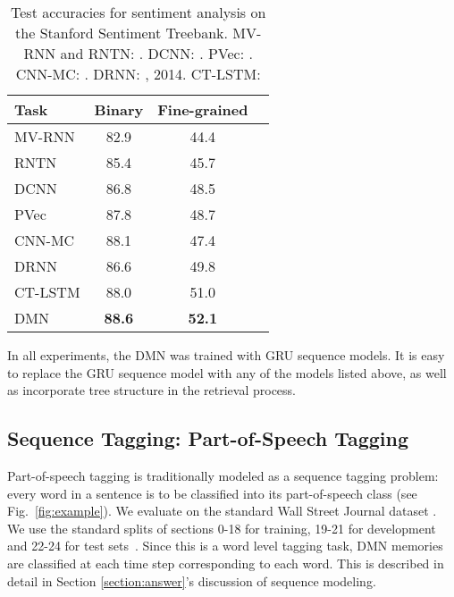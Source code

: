 \documentclass{article}
\begin{document}
\begin{table}[t!]
\begin{center}
\begin{tabular}{lccc}
\toprule
Task & Binary & Fine-grained \\
\midrule
MV-RNN	& 82.9 & 44.4 \\
RNTN 		& 85.4	& 45.7 \\
DCNN		& 86.8 & 48.5 \\
PVec	    & 87.8 & 48.7 \\
CNN-MC	& 88.1 & 47.4 \\
DRNN		& 86.6 & 49.8 \\
CT-LSTM	& 88.0 & 51.0 \\
\midrule
DMN			& \textbf{88.6} & \textbf{52.1} \\
\bottomrule   
\end{tabular}
\end{center}
\vspace{-0.3cm}
\caption{Test accuracies for sentiment analysis on the Stanford Sentiment Treebank. MV-RNN and RNTN: \citet{Socher2013EMNLP}. DCNN:  \citet{Kalchbrenner2014}. PVec: \citet{Le2014}. CNN-MC: \citet{Kim2014}. DRNN: \citet{Irsoy2015}, 2014. CT-LSTM: \citet{Tai2015}
}
\label{ResultsSentiment}
\vspace{-0.3cm}
\end{table}

In all experiments, the DMN was trained with GRU sequence models. It is easy to replace the GRU sequence model with any of the models listed above, as well as incorporate tree structure in the retrieval process. 


\subsection{Sequence Tagging: Part-of-Speech Tagging}
Part-of-speech tagging is traditionally modeled as a sequence tagging problem: every word in a sentence is to be classified into its part-of-speech class (see Fig.~\ref{fig:example}). We evaluate on the standard Wall Street Journal dataset \cite{Marcus1993}. We use the standard splits of sections 0-18 for training, 19-21 for development and 22-24 for test sets~\cite{Sogaard2011}.
Since this is a word level tagging task, DMN memories are classified at each time step corresponding to each word. This is described in detail in Section \ref{section:answer}'s discussion of sequence modeling. 
\end{document}
